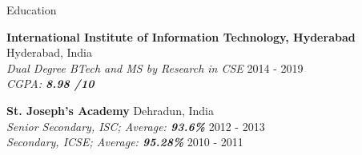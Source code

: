 \documentclass{resume} %
\begin{document}
\begin{rSection}{Education}

{\bf International Institute of Information Technology, Hyderabad} \hfill {Hyderabad, India} 
\\ \textit{Dual Degree BTech and MS by Research in CSE} \hfill {2014 - 2019}
\\ \textit{CGPA: \textbf{8.98 /10}}

{\bf St. Joseph's Academy} \hfill {Dehradun, India} 
\\ \textit{Senior Secondary, ISC; Average: \textbf{93.6\%}} \hfill {2012 - 2013}
\\ \textit{Secondary, ICSE; Average: \textbf{95.28\%}} \hfill {2010 - 2011}

\end{rSection}


\end{document}
